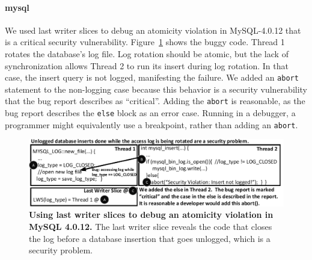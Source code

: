 \documentclass[preprint,9pt]{sigplanconf}
\begin{document}
%
%

\paragraph{mysql}

We used last writer slices to debug an atomicity violation in MySQL-4.0.12 that
is a critical security vulnerability.  Figure~\ref{fig:mysqllws} shows the
buggy code.  Thread 1 rotates the database's log file.  Log rotation should be
atomic, but the lack of synchronization allows Thread 2 to run its insert
during log rotation.  In that case, the insert query is not logged, manifesting
the failure.  We added an {\tt abort} statement to the non-logging case because
this behavior is a security vulnerability that the bug report describes as
``critical''.  Adding the {\tt abort} is reasonable, as the bug report
describes the {\tt else} block as an error case.  Running in a debugger, a
programmer might equivalently use a breakpoint, rather than adding an
{\tt abort}.


\begin{figure}[h]
\centering
\includegraphics[width=\columnwidth]{figs/MySQLDebug.pdf}
\caption{\label{fig:mysqllws}{\bf Using last writer slices to debug an
atomicity violation in MySQL 4.0.12.} The last writer slice reveals the code that closes the log before a database insertion that goes unlogged, which is a security problem.}
\end{figure}
\end{document}
